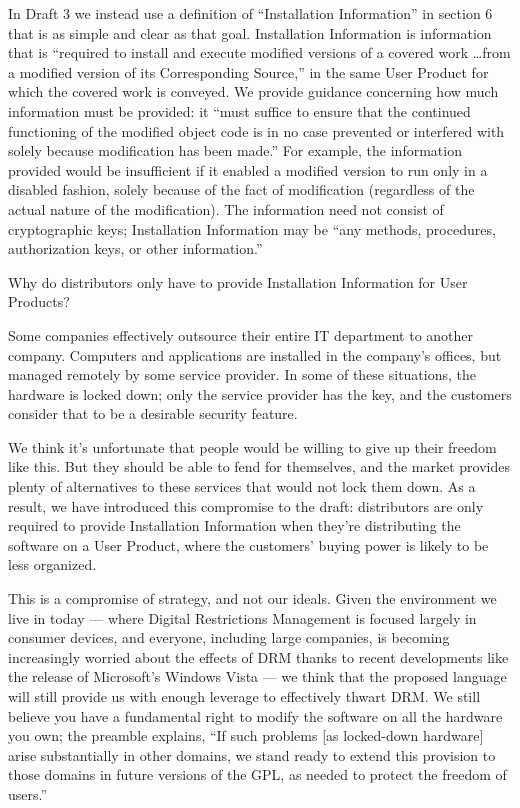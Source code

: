In Draft 3 we instead use a definition of ``Installation Information'' in
section 6 that is as simple and clear as that goal.  Installation Information
is information that is ``required to install and execute modified versions of
a covered work \dots from a modified version of its Corresponding Source,''
in the same User Product for which the covered work is conveyed.  We provide
guidance concerning how much information must be provided: it ``must suffice
to ensure that the continued functioning of the modified object code is in no
case prevented or interfered with solely because modification has been
made.''  For example, the information provided would be insufficient if it
enabled a modified version to run only in a disabled fashion, solely because
of the fact of modification (regardless of the actual nature of the
modification).  The information need not consist of cryptographic keys;
Installation Information may be ``any methods, procedures, authorization
keys, or other information.''


Why do distributors only have to provide Installation Information for User
Products?

Some companies effectively outsource their entire IT department to another
company. Computers and applications are installed in the company's offices,
but managed remotely by some service provider. In some of these situations,
the hardware is locked down; only the service provider has the key, and the
customers consider that to be a desirable security feature.

We think it's unfortunate that people would be willing to give up their
freedom like this.  But they should be able to fend for themselves, and the
market provides plenty of alternatives to these services that would not lock
them down. As a result, we have introduced this compromise to the draft:
distributors are only required to provide Installation Information when
they're distributing the software on a User Product, where the customers'
buying power is likely to be less organized.

This is a compromise of strategy, and not our ideals. Given the environment
we live in today --- where Digital Restrictions Management is focused largely
in consumer devices, and everyone, including large companies, is becoming
increasingly worried about the effects of DRM thanks to recent developments
like the release of Microsoft's Windows Vista --- we think that the proposed
language will still provide us with enough leverage to effectively thwart
DRM. We still believe you have a fundamental right to modify the software on
all the hardware you own; the preamble explains, ``If such problems [as
  locked-down hardware] arise substantially in other domains, we stand ready
to extend this provision to those domains in future versions of the GPL, as
needed to protect the freedom of users.''

